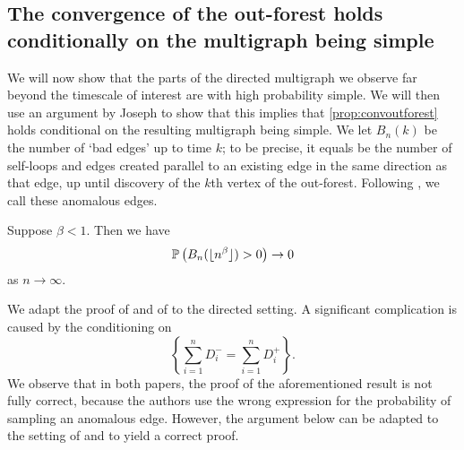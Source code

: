 \subsection{The convergence of the out-forest holds conditionally on the multigraph being simple}
We will now show that the parts of the directed multigraph we observe far beyond the timescale of interest are with high probability simple. We will then use an argument by Joseph \cite{josephComponentSizesCritical2014} to show that this implies that \cref{prop:convoutforest} holds conditional on the resulting multigraph being simple. We let $B_n(k)$ be the number of `bad edges' up to time $k$; to be precise, it equals be the number of self-loops and edges created parallel to an existing edge in the same direction as that edge, up until discovery of the $k$th vertex of the out-forest. Following \cite{conchon--kerjanStableGraphMetric2021}, we call these anomalous edges. 
\begin{proposition}\label{prop.anomalousedges}
Suppose $\beta<1$. Then we have
$$\P\left(B_n(\lfloor n^\beta \rfloor)>0\right)\to 0$$
as $n\to \infty$.
\end{proposition}
\begin{remark}
We adapt the proof of \cite[Lemma 7.1]{josephComponentSizesCritical2014} and of \cite[Proposition 5.3]{conchon--kerjanStableGraphMetric2021} to the directed setting. A significant complication is caused by the conditioning on $$\left\{\sum_{i=1}^n D^-_i=\sum_{i=1}^n D^+_i\right\}.$$ We observe that in both papers, the proof of the aforementioned result is not fully correct, because the authors use the wrong expression for the probability of sampling an anomalous edge. However, the argument below can be adapted to the setting of \cite{josephComponentSizesCritical2014} and \cite{conchon--kerjanStableGraphMetric2021} to yield a correct proof.
\end{remark}

